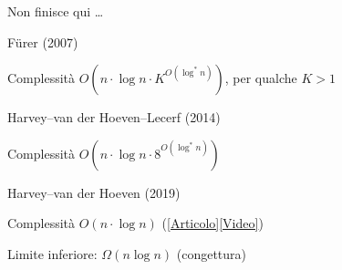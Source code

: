 \begin{frame}{Non finisce qui \ldots}

\vspace{-15pt}
\BI
\item \alert{Fürer} (2007)
  \BI
  \item Complessità $O(n \cdot \log n \cdot K^{O(\log^* n)})$, per qualche $K>1$
  \EI
\item \alert{Harvey--van der Hoeven--Lecerf} (2014)
  \BI
  \item Complessità $O(n \cdot \log n \cdot 8^{O(\log^* n)})$
  \EI
\item \alert{Harvey--van der Hoeven} (2019)
  \BI
  \item Complessità $O(n \cdot \log n)$ (\href{https://hal.archives-ouvertes.fr/hal-02070778/document}{[Articolo]}\href{https://www.youtube.com/watch?v=FKGRc867j10&ab_channel=MathsStatsUNSW}{[Video]})
  \EI
\item Limite inferiore: $\Omega(n \log n)$ (congettura)
\EI

\end{frame}

